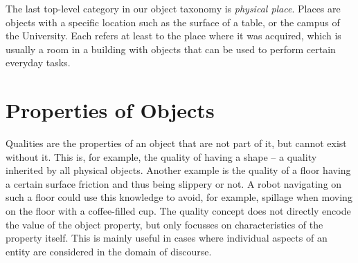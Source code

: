 The last top-level category in our object taxonomy is \emph{physical place}.
Places are objects with a specific location such as the surface of a table, or the campus of the University.
Each \neem refers at least to the place where it was acquired, which is usually a room in a building with objects that can be used to perform certain everyday tasks.
%



\section{Properties of Objects}
\label{sec:background:properties}

Qualities are the properties of an object that are not part of it, but cannot exist without it.
This is, for example, the quality of having a shape -- a quality inherited by all physical objects.
Another example is the quality of a floor having a certain surface friction and thus being slippery or not.
A robot navigating on such a floor could use this knowledge to avoid, for example,
spillage when moving on the floor with a coffee-filled cup.
The quality concept does not directly encode the value of the object property, but only focusses on characteristics of the property itself.
This is mainly useful in cases where individual aspects of an entity are considered in the domain of discourse.

